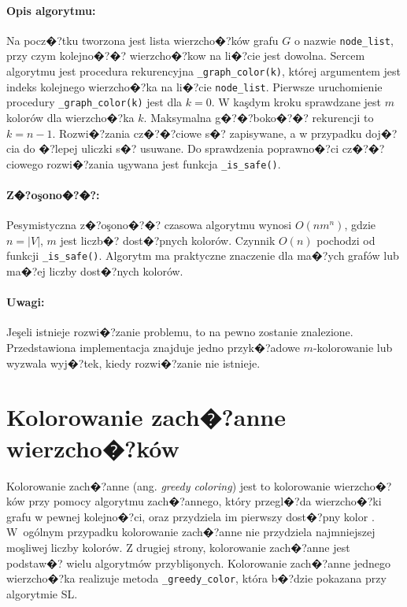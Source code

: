 \documentclass[12pt,a4paper]{mwrep}
\begin{document}
\paragraph{Opis algorytmu:} Na pocz�?tku tworzona jest lista wierzcho�?ków
grafu $G$ o nazwie \lstinline|node_list|, 
przy czym kolejno�?�? wierzcho�?kow na li�?cie jest dowolna.
Sercem algorytmu jest procedura rekurencyjna \lstinline|_graph_color(k)|,
której argumentem jest indeks kolejnego wierzcho�?ka na li�?cie
\lstinline|node_list|. Pierwsze uruchomienie procedury
\lstinline|_graph_color(k)| jest dla $k=0$.
W kaşdym kroku sprawdzane jest $m$ kolorów dla wierzcho�?ka $k$.
Maksymalna g�?�?boko�?�? rekurencji to $k=n-1$.
Rozwi�?zania cz�?�?ciowe s�? zapisywane, a w przypadku doj�?cia
do �?lepej uliczki s�? usuwane.
Do sprawdzenia poprawno�?ci cz�?�?ciowego rozwi�?zania uşywana jest
funkcja \lstinline|_is_safe()|.

\paragraph{Z�?oşono�?�?:} Pesymistyczna z�?oşono�?�? czasowa algorytmu 
wynosi $O(n m^n)$, gdzie $n=|V|$, $m$ jest liczb�? dost�?pnych kolorów.
Czynnik $O(n)$ pochodzi od funkcji \lstinline|_is_safe()|.
Algorytm ma praktyczne znaczenie dla ma�?ych grafów
lub ma�?ej liczby dost�?nych kolorów.

\paragraph{Uwagi:} Jeşeli istnieje rozwi�?zanie problemu, to na pewno
zostanie znalezione. Przedstawiona implementacja znajduje jedno
przyk�?adowe $m$-kolorowanie lub wyzwala wyj�?tek, kiedy rozwi�?zanie
nie istnieje.




\section{Kolorowanie zach�?anne wierzcho�?ków}
\label{sec:greedy_vertex_coloring}

Kolorowanie zach�?anne (ang. \emph{greedy coloring})
jest to kolorowanie wierzcho�?ków przy pomocy algorytmu zach�?annego,
który przegl�?da wierzcho�?ki grafu w pewnej kolejno�?ci, oraz
przydziela im pierwszy dost�?pny kolor
\cite{wiki_greedy_coloring}.
W~ogólnym przypadku kolorowanie zach�?anne nie przydziela
najmniejszej moşliwej liczby kolorów. Z drugiej strony,
kolorowanie zach�?anne jest podstaw�? wielu algorytmów przyblişonych.
Kolorowanie zach�?anne jednego wierzcho�?ka
realizuje metoda \lstinline|_greedy_color|,
która b�?dzie pokazana przy algorytmie SL.
\end{document}
